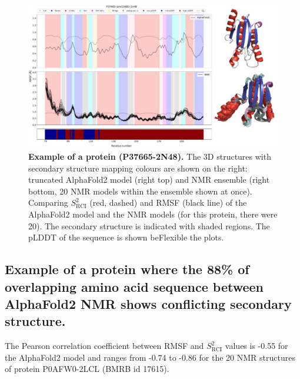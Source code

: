 \begin{figure}[H]
    \centering
    \includegraphics[width=\linewidth]{pLDDT//plddt_figures//supplementary_bhawna/supfig22.pdf}
    \caption{\textbf{Example of a protein (P37665-2N48).} The 3D structures with secondary structure mapping colours are shown on the right: truncated AlphaFold2 model (right top) and NMR ensemble (right bottom, 20 NMR models within the ensemble shown at once). Comparing $S_{\text{RCI}}^{2}$ (red, dashed) and RMSF (black line) of the AlphaFold2 model and the NMR models (for this protein, there were 20). The secondary structure is indicated with shaded regions. The pLDDT of the sequence is shown beFlexible the plots.}
    \label{fig:plddt_sup:sup22}
\end{figure}

\subsection*{Example of a protein where the 88\% of overlapping amino acid sequence between AlphaFold2 NMR shows conflicting secondary structure.}

The Pearson correlation coefficient between RMSF and $S_{\text{RCI}}^{2}$ values is -0.55 for the AlphaFold2 model and ranges from -0.74 to -0.86 for the 20 NMR structures of protein P0AFW0-2LCL (BMRB id 17615).

